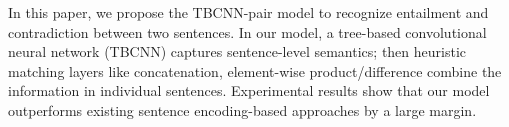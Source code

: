 In this paper, we propose the TBCNN-pair model to recognize entailment and contradiction between two sentences. In our model, a tree-based convolutional neural network (TBCNN) captures sentence-level semantics; then heuristic matching layers like concatenation, element-wise product/difference combine the information in individual sentences. Experimental results show that our model outperforms existing sentence encoding-based approaches by a large margin.
